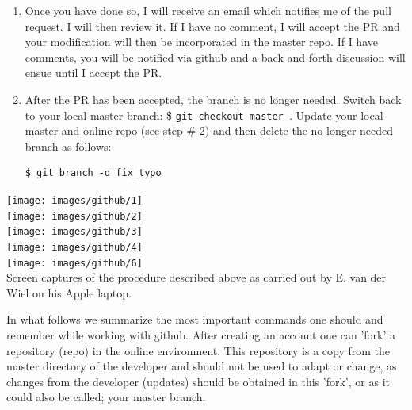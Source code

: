 \begin{enumerate}
\item Once you have done so, I will receive an email which notifies me of the pull request. I will 
then review it. If I have no comment, I will accept the PR and your modification will 
then be incorporated in the master repo. If I have comments, you will be notified via github and a 
back-and-forth discussion will ensue until I accept the PR. 

\item After the PR has been accepted, the branch is no longer needed. Switch back to your local master branch:
\$ \verb"git checkout master ".
Update your local master and online repo (see step \# 2) and then delete the no-longer-needed 
branch as follows:
\begin{verbatim}
$ git branch -d fix_typo
\end{verbatim}
\end{enumerate}

\newpage
\begin{center}
\texttt{[image: images/github/1]}\\
\texttt{[image: images/github/2]}\\
\texttt{[image: images/github/3]}\\
\texttt{[image: images/github/4]}\\
\texttt{[image: images/github/6]}\\
{\captionfont Screen captures of the procedure described above as 
carried out by E. van der Wiel on his Apple laptop.}
\end{center}
















































\newpage
In what follows we summarize the most important commands one should and remember while working with github. 
After creating an account one can 'fork' a repository (repo) in the online environment. This repository is a 
copy from the master directory of the developer and should not be used to adapt or change, as changes from the developer (updates) should be obtained in this 'fork', or as it could also be called; your master branch. 
  
